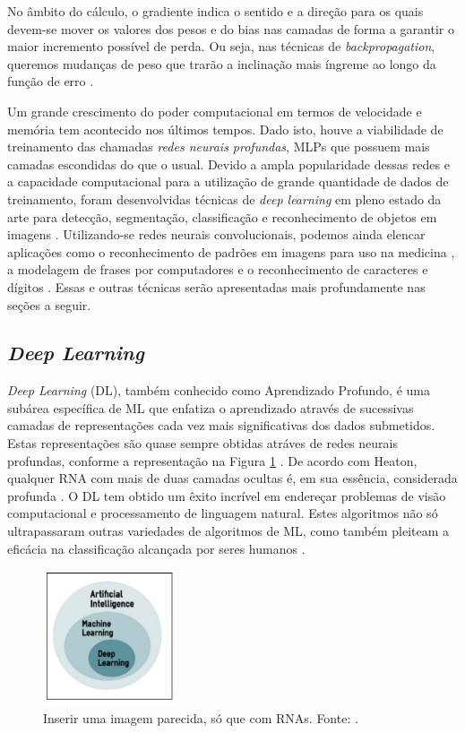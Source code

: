 No âmbito do cálculo, o gradiente indica o sentido e a direção para os quais devem-se mover os valores dos pesos e do bias nas camadas de forma a garantir o maior incremento possível de perda. Ou seja, nas técnicas de \emph{backpropagation}, queremos mudanças de peso que trarão a inclinação mais íngreme ao longo da função de erro \cite{goodfellow, kubat}.

Um grande crescimento do poder computacional em termos de velocidade e memória tem acontecido nos últimos tempos. Dado isto, houve a viabilidade de treinamento das chamadas \emph{redes neurais profundas}, MLPs que possuem mais camadas escondidas do que o usual. Devido a ampla popularidade dessas redes e a capacidade computacional para a utilização de grande quantidade de dados de treinamento, foram desenvolvidas técnicas de \emph{deep learning} em pleno estado da arte para detecção, segmentação, classificação e reconhecimento de objetos em imagens \cite{khan}. Utilizando-se redes neurais convolucionais, podemos ainda elencar aplicações como o reconhecimento de padrões em imagens para uso na medicina \cite{cha}, a modelagem de frases por computadores \cite{kalchbrenner} e o reconhecimento de caracteres e dígitos \cite{lecun}. Essas e outras técnicas serão apresentadas mais profundamente nas seções a seguir.


\subsection{\emph{Deep Learning}}
\label{subsec:dl}

\emph{Deep Learning} (DL), também conhecido como Aprendizado Profundo, é uma subárea específica de ML que enfatiza o aprendizado através de sucessivas camadas de representações cada vez mais significativas dos dados submetidos. Estas representações são quase sempre obtidas atráves de redes neurais profundas, conforme a representação na Figura \ref{fig:areas-ia} \cite{chollet}. De acordo com Heaton, qualquer RNA com mais de duas camadas ocultas é, em sua essência, considerada profunda \cite{heaton}. O DL tem obtido um êxito incrível em endereçar problemas de visão computacional e processamento de linguagem natural. Estes algoritmos não só ultrapassaram outras variedades de algoritmos de ML, como também pleiteam a eficácia na classificação alcançada por seres humanos \cite{buduma}.

\begin{figure}[h!]
\centering
\includegraphics[height=4cm]{imgs/ia-ml-dl}
\caption{Inserir uma imagem parecida, só que com RNAs. Fonte: \cite{gulli}.}
\label{fig:areas-ia}
\end{figure}

